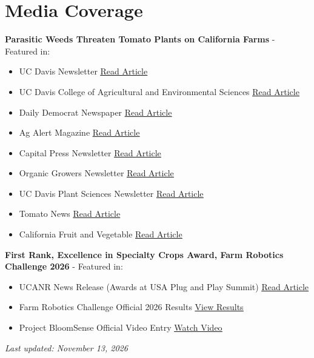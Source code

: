 \documentclass[11pt,a4paper]{article}
\begin{document}
\section{Media Coverage}

\textbf{Parasitic Weeds Threaten Tomato Plants on California Farms} - Featured in:
\begin{itemize}
    \item UC Davis Newsletter \href{https://www.ucdavis.edu/food/news/parasitic-weeds-threaten-tomato-plants-on-california-farms}{\underline{Read Article}}
    \item UC Davis College of Agricultural and Environmental Sciences \href{https://caes.ucdavis.edu/news/parasitic-weeds-threaten-tomato-plants-california-farms}{\underline{Read Article}}
    \item Daily Democrat Newspaper \href{https://www.dailydemocrat.com/2024/03/20/parasitic-weeds-threaten-tomato-plants-on-california-farms}{\underline{Read Article}}
    \item Ag Alert Magazine \href{https://california-farm-bureau-publications.cfbf.com/view/617470051/8}{\underline{Read Article}}
    \item Capital Press Newsletter \href{https://www.capitalpress.com/ag_sectors/research/the-enemy-underground-california-researchers-target-parasitic-weed/article_708c3668-613b-11ee-9e7f-137682d06e8c.html}{\underline{Read Article}}
    \item Organic Growers Newsletter \href{https://organicgrower.info/news/researchers-fight-weeds-threatening-california-tomatoes}{\underline{Read Article}}
    \item UC Davis Plant Sciences Newsletter \href{https://www.plantsciences.ucdavis.edu/news/parasitic-weeds-tomato-hanson}{\underline{Read Article}}
    \item Tomato News \href{https://www.tomatonews.com/en/broomrape-parasitic-weeds-threaten-california-tomato-fields_2_2117.html}{\underline{Read Article}}
    \item California Fruit and Vegetable \href{https://calfruitandveg.com/2024/04/29/read-2024-issue}{\underline{Read Article}}
\end{itemize}

\vspace{0.4cm}

\noindent\textbf{First Rank, Excellence in Specialty Crops Award, Farm Robotics Challenge 2026} - Featured in:
\begin{itemize}
    \item UCANR News Release (Awards at USA Plug and Play Summit) \href{https://ucanr.edu/blog/anr-news-releases/article/frc-winners-2026}{\underline{Read Article}}
    \item Farm Robotics Challenge Official 2026 Results \href{https://www.farmroboticschallenge.ai/2026results}{\underline{View Results}}
    \item Project BloomSense Official Video Entry \href{https://www.farmroboticschallenge.ai/2026results/v/uc-davis}{\underline{Watch Video}}
\end{itemize}

\vfill

\begin{center}
\textit{Last updated: November 13, 2026}
\end{center}
\end{document}
